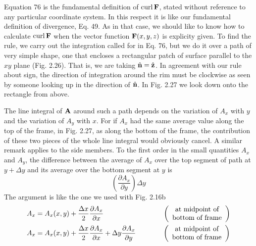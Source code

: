 Equation 76 is the fundamental definition of $\operatorname{curl}\mathbf{F}$, stated without
reference to any particular coordinate system. In this respect it
is like our fundamental definition of divergence, Eq. 49. As in that
case, we should like to know how to calculate $\operatorname{curl}\mathbf{F}$ when the vector
function $\mathbf{F}(x,y,z)$ is explicity given. To find the rule, we carry out
the integration called for in Eq. 76, but we do it over a path of very
simple shape, one that encloses a rectangular patch of surface parallel
to the $xy$ plane (Fig. 2.26). That is, we are taking $\hat{\mathbf{n}}=\hat{\mathbf{z}}$. In
agreement with our rule about sign, the direction of integration
around the rim must be clockwise as seen by someone looking up
in the direction of $\hat{\mathbf{n}}$. In Fig. 2.27 we look down onto the rectangle
from above.

The line integral of $\mathbf{A}$ around such a path depends on the variation
of $A_x$ with $y$ and the variation of $A_y$ with $x$. For if $A_x$ had the same
average value along the top of the frame, in Fig. 2.27, as along the
bottom of the frame, the contribution of these two pieces of the whole
line integral would obviously cancel. A similar remark applies to
the side members. To the first order in the small quantities $A_x$ and
$A_y$, the difference between the average of $A_x$ over the top segment of
path at $y + \Delta y$ and its average over the bottom segment at $y$ is
\begin{equation}
  \left(\frac{\partial A_x}{\partial y}\right)\Delta y
\end{equation}
The argument is like the one we used with Fig. 2.16b
\begin{align}
\begin{split}
  A_x &= A_x(x,y) + \frac{\Delta x}{2} \frac{\partial A_x}{\partial x} 
         \hspace{30mm} %
             \left(
                  \begin{array}{cc}
                    \text{at midpoint of} \\
                    \text{bottom of frame}
                  \end{array}
             \right) \\
  A_x &= A_x(x,y) + \frac{\Delta x}{2} \frac{\partial A_x}{\partial x}
                  + \Delta y \frac{\partial A_x}{\partial y}
         \hspace{13.5mm} %
             \left(
                  \begin{array}{cc}
                    \text{at midpoint of} \\
                    \text{bottom of frame}
                  \end{array}
             \right)
\end{split}
\end{align}
